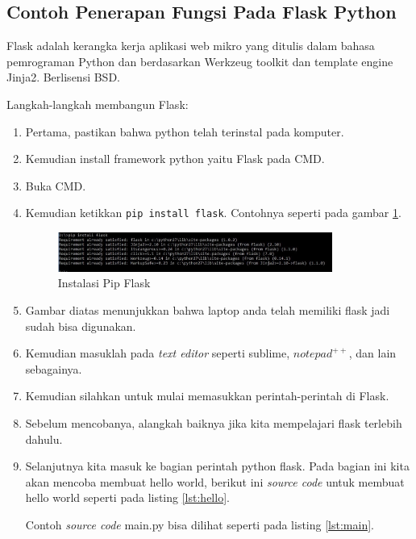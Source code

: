 \subsection{Contoh Penerapan Fungsi Pada Flask Python}

Flask adalah kerangka kerja aplikasi web mikro yang ditulis dalam bahasa pemrograman Python dan berdasarkan Werkzeug toolkit dan template engine Jinja2. Berlisensi BSD.

Langkah-langkah membangun Flask:
\begin{enumerate}
\item Pertama, pastikan bahwa python telah terinstal pada komputer.
\item Kemudian install framework python yaitu Flask pada CMD.
\item Buka CMD.
\item Kemudian ketikkan \verb|pip install flask|. Contohnya seperti pada gambar \ref{fig:install_pip}.
\begin{figure}[!htbp]
	\centerline{\includegraphics[width=0.85\textwidth]{figures/8/install_pip.jpg}}
	\caption{Instalasi Pip Flask}
	\label{fig:install_pip}
\end{figure} 

\item Gambar   diatas   menunjukkan   bahwa   laptop   anda   telah memiliki flask jadi sudah bisa digunakan.
\item Kemudian masuklah pada \textit{text editor} seperti sublime, $notepad^{++}$, dan lain sebagainya.
\item Kemudian silahkan untuk mulai memasukkan perintah-perintah di Flask.
\item Sebelum mencobanya, alangkah baiknya jika kita mempelajari flask terlebih dahulu.
\item Selanjutnya kita masuk ke bagian perintah python flask. Pada bagian ini kita akan mencoba membuat hello world, berikut ini \textit{source code} untuk membuat hello world seperti pada listing \ref{lst:hello}.


 Contoh \textit{source code} main.py bisa dilihat seperti pada listing \ref{lst:main}.



\end{enumerate}
